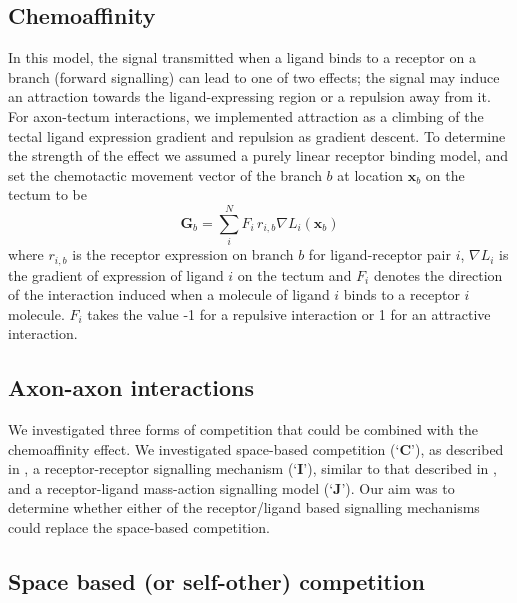 \documentclass[11pt, a4paper]{article}
\begin{document}
\subsection*{Chemoaffinity}

In this model, the signal transmitted when a ligand binds to a receptor on a
branch (forward signalling) can lead to one of two effects; the signal may
induce an attraction towards the ligand-expressing region or a repulsion away
from it.
%
For axon-tectum interactions, we implemented attraction as a climbing of the
tectal ligand expression gradient and repulsion as gradient descent.
%
To determine the strength of the effect we assumed a purely linear receptor
binding model, and set the chemotactic movement vector of the branch $b$ at
location $\mathbf{x}_b$ on the tectum to be
%
\begin{equation}
\mathbf{G}_b = \sum_i^N F_i\,r_{i,b} \nabla L_i(\mathbf{x}_b)
\end{equation}
%
where $r_{i,b}$ is the receptor expression on branch $b$ for ligand-receptor
pair $i$, $\nabla L_i$ is the gradient of expression of ligand $i$ on the
tectum and $F_i$ denotes the direction of the interaction induced when a
molecule of ligand $i$ binds to a receptor $i$ molecule. $F_i$ takes the value
-1 for a repulsive interaction or 1 for an attractive interaction.

\subsection*{Axon-axon interactions}

We investigated three forms of competition that could be combined with the
chemoaffinity effect. We investigated space-based competition
(`$\mathbf{C}$'), as described in \citet{simpson_simple_2011}, a
receptor-receptor signalling mechanism (`$\mathbf{I}$'), similar to that
described in \citet{simpson_simple_2011}, and a receptor-ligand mass-action
signalling model (`$\mathbf{J}$'). Our aim was to determine whether either of
the receptor/ligand based signalling mechanisms could replace the space-based
competition.

\subsection*{Space based (or self-other) competition}
\end{document}
